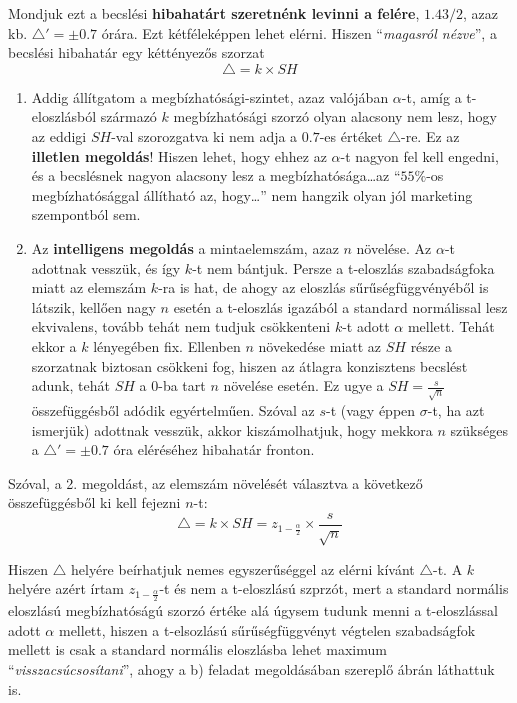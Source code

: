 \documentclass[
]{book}
\begin{document}
Mondjuk ezt a becslési \textbf{hibahatárt szeretnénk levinni a felére}, \(1.43/2\), azaz kb. \(\triangle'= \pm 0.7\) órára. Ezt kétféleképpen lehet elérni. Hiszen ``\emph{magasról nézve}'', a becslési hibahatár egy kéttényezős szorzat \[\triangle=k \times SH\]

\begin{enumerate}
\def\labelenumi{\arabic{enumi}.}
\item
  Addig állítgatom a megbízhatósági-szintet, azaz valójában \(\alpha\)-t, amíg a t-eloszlásból származó \(k\) megbízhatósági szorzó olyan alacsony nem lesz, hogy az eddigi \(SH\)-val szorozgatva ki nem adja a \(0.7\)-es értéket \(\triangle\)-re. Ez az \textbf{illetlen megoldás}! Hiszen lehet, hogy ehhez az \(\alpha\)-t nagyon fel kell engedni, és a becslésnek nagyon alacsony lesz a megbízhatósága\ldots az ``\(55\%\)-os megbízhatósággal állítható az, hogy\ldots{}'' nem hangzik olyan jól marketing szempontból sem.
\item
  Az \textbf{intelligens megoldás} a mintaelemszám, azaz \(n\) növelése. Az \(\alpha\)-t adottnak vesszük, és így \(k\)-t nem bántjuk. Persze a t-eloszlás szabadságfoka miatt az elemszám \(k\)-ra is hat, de ahogy az eloszlás sűrűségfüggvényéből is látszik, kellően nagy \(n\) esetén a t-eloszlás igazából a standard normálissal lesz ekvivalens, tovább tehát nem tudjuk csökkenteni \(k\)-t adott \(\alpha\) mellett. Tehát ekkor a \(k\) lényegében fix. Ellenben \(n\) növekedése miatt az \(SH\) része a szorzatnak biztosan csökkeni fog, hiszen az átlagra konzisztens becslést adunk, tehát \(SH\) a \(0\)-ba tart \(n\) növelése esetén. Ez ugye a \(SH=\frac{s}{\sqrt{n}}\) összefüggésből adódik egyértelműen. Szóval az \(s\)-t (vagy éppen \(\sigma\)-t, ha azt ismerjük) adottnak vesszük, akkor kiszámolhatjuk, hogy mekkora \(n\) szükséges a \(\triangle'= \pm 0.7\) óra eléréséhez hibahatár fronton.
\end{enumerate}

Szóval, a 2. megoldást, az elemszám növelését választva a következő összefüggésből ki kell fejezni \(n\)-t: \[\triangle=k \times SH = z_{1-\frac{\alpha}{2}} \times \frac{s}{\sqrt{n}}\]

Hiszen \(\triangle\) helyére beírhatjuk nemes egyszerűséggel az elérni kívánt \(\triangle\)-t. A \(k\) helyére azért írtam \(z_{1-\frac{\alpha}{2}}\)-t és nem a t-eloszlású szprzót, mert a standard normális eloszlású megbízhatóságú szorzó értéke alá úgysem tudunk menni a t-eloszlással adott \(\alpha\) mellett, hiszen a t-elsozlású sűrűségfüggvényt végtelen szabadságfok mellett is csak a standard normális eloszlásba lehet maximum ``\emph{visszacsúcsosítani}'', ahogy a b) feladat megoldásában szereplő ábrán láthattuk is.
\end{document}
